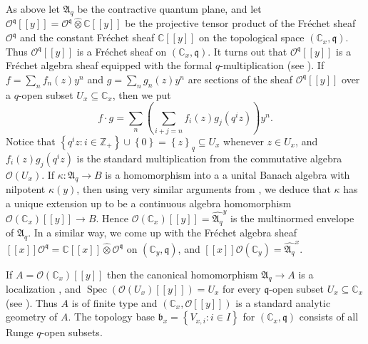 \documentclass[12pt]{amsart}%
\theoremstyle{plain}
\numberwithin{equation}{section}
\numberwithin{equation}{section}
\numberwithin{theorem}{section}
\numberwithin{lemma}{section}
\numberwithin{remark}{section}
\numberwithin{example}{section}
\numberwithin{proposition}{section}
\numberwithin{definition}{section}
\numberwithin{corollary}{section}
\begin{document}
As above let $\mathfrak{A}_{q}$ be the contractive quantum plane, and let
$\mathcal{O}^{\mathfrak{q}}\left[  \left[  y\right]  \right]  =\mathcal{O}%
^{\mathfrak{q}}\widehat{\otimes}\mathbb{C}\left[  \left[  y\right]  \right]  $
be the projective tensor product of the Fr\'{e}chet sheaf $\mathcal{O}%
^{\mathfrak{q}}$ and the constant Fr\'{e}chet sheaf $\mathbb{C}\left[  \left[
y\right]  \right]  $ on the topological space $\left(  \mathbb{C}%
_{x},\mathfrak{q}\right)  $. Thus $\mathcal{O}^{\mathfrak{q}}\left[  \left[
y\right]  \right]  $ is a Fr\'{e}chet sheaf on $\left(  \mathbb{C}%
_{x},\mathfrak{q}\right)  $. It turns out that $\mathcal{O}^{\mathfrak{q}%
}\left[  \left[  y\right]  \right]  $ is a Fr\'{e}chet algebra sheaf equipped
with the formal $q$-multiplication (see \cite{Dosi25}). If $f=\sum_{n}%
f_{n}\left(  z\right)  y^{n}$ and $g=\sum_{n}g_{n}\left(  z\right)  y^{n}$ are
sections of the sheaf $\mathcal{O}^{\mathfrak{q}}\left[  \left[  y\right]
\right]  $ over a $q$-open subset $U_{x}\subseteq\mathbb{C}_{x}$, then we put
\begin{equation}
f\cdot g=\sum_{n}\left(  \sum_{i+j=n}f_{i}\left(  z\right)  g_{j}\left(
q^{i}z\right)  \right)  y^{n}. \label{lm1}%
\end{equation}
Notice that $\left\{  q^{i}z:i\in\mathbb{Z}_{+}\right\}  \cup\left\{
0\right\}  =\left\{  z\right\}  _{q}\subseteq U_{x}$ whenever $z\in U_{x}$,
and $f_{i}\left(  z\right)  g_{j}\left(  q^{i}z\right)  $ is the standard
multiplication from the commutative algebra $\mathcal{O}\left(  U_{x}\right)
$. If $\kappa:\mathfrak{A}_{q}\rightarrow B$ is a homomorphism into a a unital
Banach algebra with nilpotent $\kappa\left(  y\right)  $, then using very
similar arguments from \cite{DosiSS}, we deduce that $\kappa$ has a unique
extension up to be a continuous algebra homomorphism $\mathcal{O}\left(
\mathbb{C}_{x}\right)  \left[  \left[  y\right]  \right]  \rightarrow B$.
Hence $\mathcal{O}\left(  \mathbb{C}_{x}\right)  \left[  \left[  y\right]
\right]  =\widehat{\mathfrak{A}_{q}}^{y}$ is the multinormed envelope of
$\mathfrak{A}_{q}$. In a similar way, we come up with the Fr\'{e}chet algebra
sheaf $\left[  \left[  x\right]  \right]  \mathcal{O}^{\mathfrak{q}%
}=\mathbb{C}\left[  \left[  x\right]  \right]  \widehat{\otimes}%
\mathcal{O}^{\mathfrak{q}}$ on $\left(  \mathbb{C}_{y},\mathfrak{q}\right)  $,
and $\left[  \left[  x\right]  \right]  \mathcal{O}\left(  \mathbb{C}%
_{y}\right)  =\widehat{\mathfrak{A}_{q}}^{x}$.

If $A=\mathcal{O}\left(  \mathbb{C}_{x}\right)  \left[  \left[  y\right]
\right]  $ then the canonical homomorphism $\mathfrak{A}_{q}\rightarrow A$ is
a localization \cite{DosiLoc}, and $\operatorname{Spec}\left(  \mathcal{O}%
\left(  U_{x}\right)  \left[  \left[  y\right]  \right]  \right)  =U_{x}$ for
every $\mathfrak{q}$-open subset $U_{x}\subseteq\mathbb{C}_{x}$ (see
\cite[Corollary 5.4]{Dosi25}). Thus $A$ is of finite type and $\left(
\mathbb{C}_{x},\mathcal{O}\left[  \left[  y\right]  \right]  \right)  $ is a
standard analytic geometry of $A$. The topology base $\mathfrak{b}%
_{x}=\left\{  V_{x,i}:i\in I\right\}  $ for $\left(  \mathbb{C}_{x}%
,\mathfrak{q}\right)  $ consists of all Runge $q$-open subsets.
\end{document}

